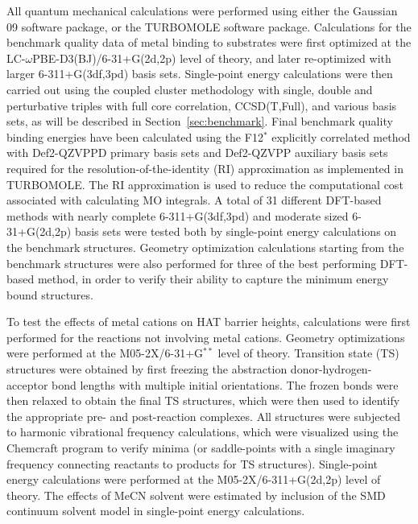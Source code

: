 All quantum mechanical calculations were performed using either the Gaussian 09
software package,\cite{Frisch2009} or the TURBOMOLE software
package.\cite{turbomole} Calculations for the benchmark quality data of metal
binding to substrates were first optimized at the
LC-$\omega$PBE-D3(BJ)/6-31+G(2d,2p) level of theory,\cite{Vydrov2006,
Vydrov2006a, Grimme2010, Johnson2006} and later re-optimized with larger
6-311+G(3df,3pd) basis sets. Single-point energy calculations were then carried
out using the coupled cluster methodology with single, double and perturbative
triples with full core correlation, CCSD(T,Full), and various basis sets, as
will be described in Section~\ref{sec:benchmark}. Final benchmark quality
binding energies have been calculated using the F12$^*$ explicitly correlated
method with Def2-QZVPPD primary basis sets and Def2-QZVPP auxiliary basis sets
required for the resolution-of-the-identity (RI) approximation as implemented
in TURBOMOLE. The RI approximation is used to reduce the computational cost
associated with calculating MO integrals. A total of 31 different
DFT-based methods with nearly complete 6-311+G(3df,3pd) and moderate sized
6-31+G(2d,2p) basis sets were tested both by single-point energy calculations
on the benchmark structures. Geometry optimization calculations starting from
the benchmark structures were also performed for three of the best performing
DFT-based method, in order to verify their ability to capture the minimum
energy bound structures.

To test the effects of metal cations on HAT barrier heights, calculations were
first performed for the reactions not involving metal cations. Geometry
optimizations were performed at the M05-2X\cite{Zhao2006}/6-31+G$^{**}$ level
of theory. Transition state (TS) structures were obtained by first freezing the
abstraction donor-hydrogen-acceptor bond lengths with multiple initial
orientations. The frozen bonds were then relaxed to obtain the final TS
structures, which were then used to identify the appropriate pre- and
post-reaction complexes. All structures were subjected to harmonic vibrational
frequency calculations, which were visualized using the Chemcraft
program\cite{ccraft} to verify minima (or saddle-points with a single imaginary
frequency connecting reactants to products for TS structures). Single-point
energy calculations were performed at the M05-2X/6-311+G(2d,2p) level of
theory. The effects of MeCN solvent were estimated by inclusion of the
SMD\cite{Marenich2009} continuum solvent model in single-point energy
calculations.

